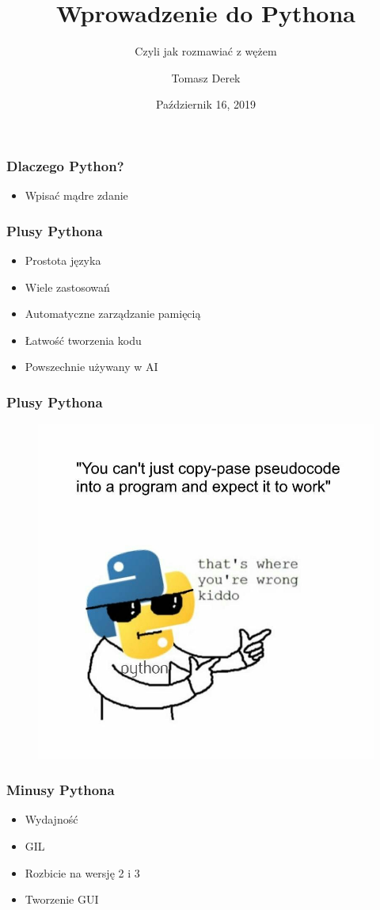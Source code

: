 \documentclass[17pt]{beamer}
\title{Wprowadzenie do Pythona}
\subtitle{Czyli jak rozmawiać z wężem}
\author{Tomasz Derek}
\institute{KMS}
\date{Październik 16, 2019}
\begin{document}
 
\frame{\titlepage}
 
\begin{frame}
\frametitle{Dlaczego Python?}
\begin{itemize}
\item Wpisać mądre zdanie
\end{itemize}
\end{frame} 
 
\begin{frame}
\frametitle{Plusy Pythona}
\begin{itemize}
\item Prostota języka
\item Wiele zastosowań
\item Automatyczne zarządzanie pamięcią
\item Łatwość tworzenia kodu
\item Powszechnie używany w AI
\end{itemize}
\end{frame}

\begin{frame}
\frametitle{Plusy Pythona}
\begin{figure}[ht]
\includegraphics[scale=0.25]{./kiddo.jpeg}
\end{figure}
\end{frame}

\begin{frame}
\frametitle{Minusy Pythona}
\begin{itemize}
\item Wydajność
\item GIL
\item Rozbicie na wersję 2 i 3
\item Tworzenie GUI
\end{itemize}
\end{frame}
\end{document}
